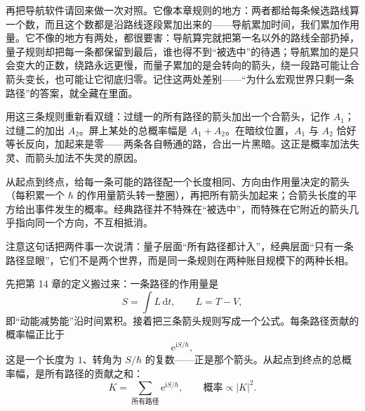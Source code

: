 再把导航软件请回来做一次对照。它像本章规则的地方：两者都给每条候选路线算一个数，而且这个数都是沿路线逐段累加出来的——导航累加时间，我们累加作用量。它不像的地方有两处，都很要害：导航算完就把第一名以外的路线全部扔掉，量子规则却把每一条都保留到最后，谁也得不到“被选中”的待遇；导航累加的是只会变大的正数，绕路永远更慢，而量子累加的是会转向的箭头，绕一段路可能让合箭头变长，也可能让它彻底归零。记住这两处差别——“为什么宏观世界只剩一条路径”的答案，就全藏在里面。

\begin{center}
\end{center}

用这三条规则重新看双缝：过缝一的所有路径的箭头加出一个合箭头，记作 \(A_1\)；过缝二的加出 \(A_2\)。屏上某处的总概率幅是 \(A_1+A_2\)。在暗纹位置，\(A_1\) 与 \(A_2\) 恰好等长反向，加起来是零——两条各自畅通的路，合出一片黑暗。这正是概率加法失灵、而箭头加法不失灵的原因。


\begin{oneline}
从起点到终点，给每一条可能的路径配一个长度相同、方向由作用量决定的箭头（每积累一个 \(\hbar\) 的作用量箭头转一整圈），再把所有箭头加起来；合箭头长度的平方给出事件发生的概率。经典路径并不特殊在“被选中”，而特殊在它附近的箭头几乎指向同一个方向，不互相抵消。
\end{oneline}

注意这句话把两件事一次说清：量子层面“所有路径都计入”，经典层面“只有一条路径显眼”，它们不是两个世界，而是同一条规则在两种账目规模下的两种长相。


先把第 14 章的定义搬过来：一条路径的作用量是
\[
S=\int L\,\mathrm{d}t,\qquad L=T-V,
\]
即“动能减势能”沿时间累积。接着把三条箭头规则写成一个公式。每条路径贡献的概率幅正比于
\[
\mathrm{e}^{\mathrm{i}S/\hbar},
\]
这是一个长度为 \(1\)、转角为 \(S/\hbar\) 的复数——正是那个箭头。从起点到终点的总概率幅，是所有路径的贡献之和：
\[
K=\sum_{\text{所有路径}}\mathrm{e}^{\mathrm{i}S/\hbar},
\qquad\text{概率}\propto |K|^2 .
\]

